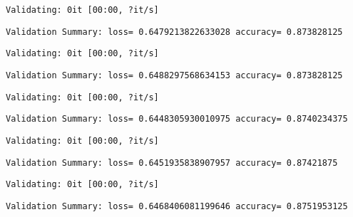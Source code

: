 \documentclass[11pt]{article}
\begin{document}
    
    \begin{Verbatim}[commandchars=\\\{\}]
Validating: 0it [00:00, ?it/s]
    \end{Verbatim}

    
    \begin{Verbatim}[commandchars=\\\{\}]
Validation Summary: loss= 0.6479213822633028 accuracy= 0.873828125
    \end{Verbatim}

    
    \begin{Verbatim}[commandchars=\\\{\}]
Validating: 0it [00:00, ?it/s]
    \end{Verbatim}

    
    \begin{Verbatim}[commandchars=\\\{\}]
Validation Summary: loss= 0.6488297568634153 accuracy= 0.873828125
    \end{Verbatim}

    
    \begin{Verbatim}[commandchars=\\\{\}]
Validating: 0it [00:00, ?it/s]
    \end{Verbatim}

    
    \begin{Verbatim}[commandchars=\\\{\}]
Validation Summary: loss= 0.6448305930010975 accuracy= 0.8740234375
    \end{Verbatim}

    
    \begin{Verbatim}[commandchars=\\\{\}]
Validating: 0it [00:00, ?it/s]
    \end{Verbatim}

    
    \begin{Verbatim}[commandchars=\\\{\}]
Validation Summary: loss= 0.6451935838907957 accuracy= 0.87421875
    \end{Verbatim}

    
    \begin{Verbatim}[commandchars=\\\{\}]
Validating: 0it [00:00, ?it/s]
    \end{Verbatim}

    
    \begin{Verbatim}[commandchars=\\\{\}]
Validation Summary: loss= 0.6468406081199646 accuracy= 0.8751953125
    \end{Verbatim}
\end{document}
